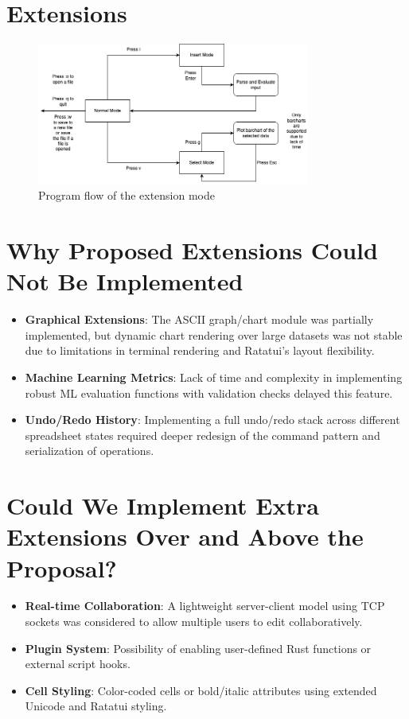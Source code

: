 \documentclass[12pt]{article}
\begin{document}
\section{Extensions}
\begin{figure}[ht]
    \centering
    \includegraphics[width=0.8\textwidth]{report/rust_flow.png}
    \caption{Program flow of the extension mode}
    \label{fig:high_level_design}
\end{figure}

\section{Why Proposed Extensions Could Not Be Implemented}

\begin{itemize}
\item \textbf{Graphical Extensions}: The ASCII graph/chart module was partially implemented, but dynamic chart rendering over large datasets was not stable due to limitations in terminal rendering and Ratatui's layout flexibility.
\item \textbf{Machine Learning Metrics}: Lack of time and complexity in implementing robust ML evaluation functions with validation checks delayed this feature.
\item \textbf{Undo/Redo History}: Implementing a full undo/redo stack across different spreadsheet states required deeper redesign of the command pattern and serialization of operations.
\end{itemize}

\section{Could We Implement Extra Extensions Over and Above the Proposal?}

\begin{itemize}
\item \textbf{Real-time Collaboration}: A lightweight server-client model using TCP sockets was considered to allow multiple users to edit collaboratively.
\item \textbf{Plugin System}: Possibility of enabling user-defined Rust functions or external script hooks.
\item \textbf{Cell Styling}: Color-coded cells or bold/italic attributes using extended Unicode and Ratatui styling.
\end{itemize}
\end{document}
